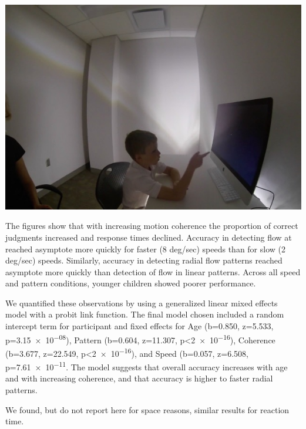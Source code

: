 \documentclass[landscape,final,paperwidth=60in,paperheight=39in,fontscale=0.285]{baposter}
\begin{document}
\begin{poster}
{\begin{center}
\includegraphics[scale=0.25]{img/apparatus-setup.jpg}
\end{center}
    }
    {
\par The figures show that with increasing motion coherence the proportion of correct judgments increased and response times declined. Accuracy in detecting flow at reached asymptote more quickly for faster (8 deg/sec) speeds than for slow (2 deg/sec) speeds. Similarly, accuracy in detecting radial flow patterns reached asymptote more quickly than detection of flow in linear patterns. Across all speed and pattern conditions, younger children showed poorer performance.
\par We quantified these observations by using a generalized linear mixed effects model with a probit link function. The final model chosen included a random intercept term for participant and fixed effects for Age (b=0.850, z=5.533, p=\num{3.15e-08}), Pattern (b=0.604, z=11.307, p<\num{2e-16}), Coherence (b=3.677, z=22.549, p<\num{2e-16}), and Speed (b=0.057, z=6.508, p=\num{7.61e-11}. The model suggests that overall accuracy increases with age and with increasing coherence, and that accuracy is higher to faster radial patterns. 
\par We found, but do not report here for space reasons, similar results for reaction time.
}


\end{poster}
\end{document}
